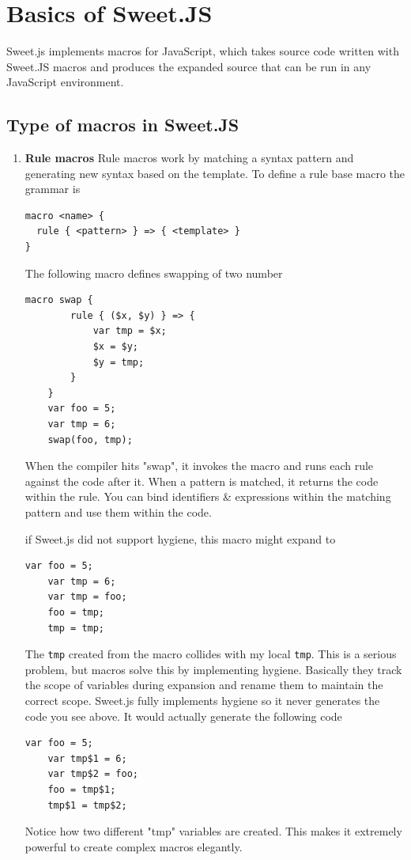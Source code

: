 \chapter{Basics of Sweet.JS}

Sweet.js implements macros for JavaScript, which takes source code written with Sweet.JS macros and produces the expanded source that can be run in any JavaScript environment. 
\section{Type of macros in Sweet.JS}
\begin{enumerate}
\item {\bf Rule macros }
Rule macros work by matching a syntax pattern and generating new syntax based on the template.
To define a rule base macro the grammar is
\begin{lstlisting}[frame=single]
macro <name> {
  rule { <pattern> } => { <template> }
}
\end{lstlisting} 

The following macro defines swapping of two number
\begin{lstlisting}[frame=single]
	macro swap {
    	rule { ($x, $y) } => {
        	var tmp = $x;
        	$x = $y;
        	$y = tmp;
    	}
	}
	var foo = 5;
	var tmp = 6;
	swap(foo, tmp);
\end{lstlisting} 

When the compiler hits "swap", it invokes the macro and runs each rule against the code after it. When a pattern is matched, it returns the code within the rule. You can bind identifiers \& expressions within the matching pattern and use them within the code.

if Sweet.js did not support hygiene, this macro might expand to
\begin{lstlisting}[frame=single]
	var foo = 5;
	var tmp = 6;
	var tmp = foo;
	foo = tmp;
	tmp = tmp;
\end{lstlisting} 
The \texttt{tmp} created from the macro collides with my local \texttt{tmp}. This is a serious problem, but macros solve this by implementing hygiene. Basically they track the scope of variables during expansion and rename them to maintain the correct scope. Sweet.js fully implements hygiene so it never generates the code you see above. It would actually generate the following code
\begin{lstlisting}[frame=single]
	var foo = 5;
	var tmp$1 = 6;
	var tmp$2 = foo;
	foo = tmp$1;
	tmp$1 = tmp$2;
\end{lstlisting} 
Notice how two different "tmp" variables are created. This makes it extremely powerful to create complex macros elegantly.


\end{enumerate}
